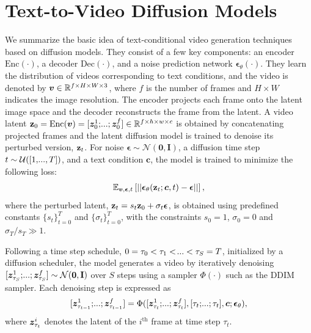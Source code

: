 
\section{Text-to-Video Diffusion Models}
\label{sec:pretrained_models}

We summarize the basic idea of text-conditional video generation techniques based on diffusion models.
They consist of a few key components: an encoder $\text{Enc}(\cdot)$, a decoder $\text{Dec}(\cdot)$, and a noise prediction network $\bm{\epsilon}_\theta(\cdot)$.
They learn the distribution of videos corresponding to text conditions, and the video is denoted by $\bm{v} \in \mathbb{R}^{f \times H \times W \times 3}$, where $f$ is the number of frames and $H\times W$ indicates the image resolution.
The encoder projects each frame onto the latent image space and the decoder reconstructs the frame from the latent.
A video latent $\z_0 =\text{Enc}(\Vv) = [\gz^1_0;\text{\myldots};\gz^f_0]\in \mathbb{R}^{f \times h \times w \times c}$ is obtained by concatenating projected frames and the latent diffusion model is trained to denoise its perturbed version, $\mathbf{z}_t$.
For noise $\bm{\epsilon} \sim \mathcal{N}(\mathbf{0}, \mathbf{I})$, a diffusion time step $t\sim \mathcal{U}([1,\text{\myldots},T])$, and a text condition $\bm{c}$, the model is trained to minimize the following loss:
%
\begin{align}\label{eq:diffusion_loss}
    \mathbb{E}_{\bm{v},\bm{\epsilon}, t}
    \left[
        ||\bm{\epsilon}_\theta(\mathbf{z}_t;\bm{c},t) - \bm{\epsilon}||
    \right],
\end{align}
%
where the perturbed latent, $\mathbf{z}_t=s_t\mathbf{z}_0 + \sigma_t\bm{\epsilon}$, is obtained using predefined constants $\{s_t\}_{t=0}^T$ and $\{\sigma_t\}_{t=0}^T$, with the constraints $s_0=1$, $\sigma_0=0$ and $\sigma_T/s_T \gg 1$.

Following a time step schedule, $0=\tau_0 < \tau_1< \text{\mycdots} <\tau_{S}=T$, initialized by a diffusion scheduler, the model generates a video by iteratively denoising $[\gz_{\tau_S}^1;\text{\myldots};\gz_{\tau_S}^f] \sim \mathcal{N}(\mathbf{0}, \mathbf{I})$ over $S$ steps using a sampler $\Phi(\cdot)$ such as the DDIM sampler.
Each denoising step is expressed as
%
\begin{align}\label{eq:diffusion_step}
    [\gz_{\tau_{t-1}}^1;\text{\myldots};\gz_{\tau_{t-1}}^f] = \Phi([\gz_{\tau_{t}}^1;\text{\myldots};\gz_{\tau_{t}}^f], [\tau_t;\text{\myldots};\tau_t], \bm{c}; \bm{\epsilon}_\theta),
\end{align}
%
where $\bm{z}_{\tau_t}^i$ denotes the latent of the $i^\text{th}$ frame at time step $\tau_t$.



